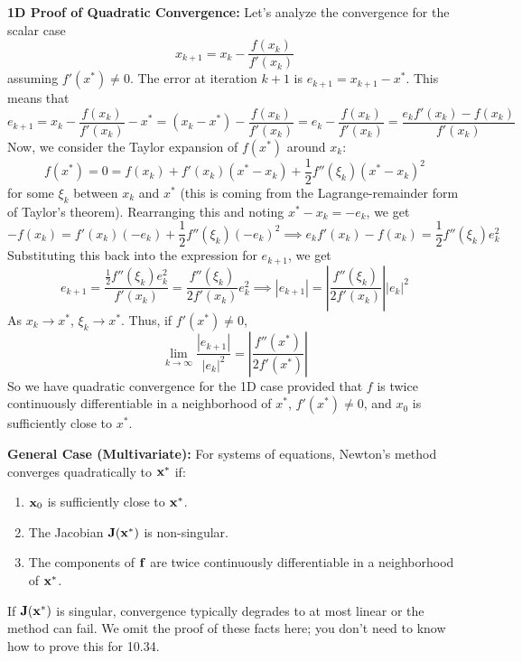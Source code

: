 \textbf{1D Proof of Quadratic Convergence:}
Let's analyze the convergence for the scalar case 
\begin{equation}
x_{k+1} = x_k - \frac{f(x_k)}{f'(x_k)}
\end{equation}
 assuming $f'(x^*) \neq 0$. The error at iteration $k+1$ is $e_{k+1} = x_{k+1} - x^*$. This means that
\begin{equation}
    e_{k+1} = x_k - \frac{f(x_k)}{f'(x_k)} - x^* = (x_k - x^*) - \frac{f(x_k)}{f'(x_k)} = e_k - \frac{f(x_k)}{f'(x_k)}
    = \frac{e_k f'(x_k) - f(x_k)}{f'(x_k)}
\end{equation}
Now, we consider the Taylor expansion of $f(x^*)$ around $x_k$:
\begin{equation}
    f(x^*) = 0 = f(x_k) + f'(x_k)(x^* - x_k) + \frac{1}{2}f''(\xi_k)(x^* - x_k)^2
\end{equation}
for some $\xi_k$ between $x_k$ and $x^*$ (this is coming from the Lagrange-remainder form of Taylor's theorem). Rearranging this and noting $x^* - x_k = -e_k$, we get
\begin{equation}
    -f(x_k) = f'(x_k)(-e_k) + \frac{1}{2}f''(\xi_k)(-e_k)^2
    \implies
    e_k f'(x_k) - f(x_k) = \frac{1}{2}f''(\xi_k)e_k^2
\end{equation}
Substituting this back into the expression for $e_{k+1}$, we get
\begin{equation}
    e_{k+1} = \frac{\frac{1}{2}f''(\xi_k)e_k^2}{f'(x_k)} = \frac{f''(\xi_k)}{2f'(x_k)} e_k^2
    \implies
    |e_{k+1}| = \left| \frac{f''(\xi_k)}{2f'(x_k)} \right| |e_k|^2
\end{equation}
As $x_k \to x^*$, $\xi_k \to x^*$. Thus, if $f'(x^*) \neq 0$,
\begin{equation}
    \lim_{k\to\infty} \frac{|e_{k+1}|}{|e_k|^2} = \left| \frac{f''(x^*)}{2f'(x^*)} \right|
\end{equation}
So we have quadratic convergence for the 1D case provided that $f$ is twice continuously differentiable in a neighborhood of $x^*$, $f'(x^*) \neq 0$, and $x_0$ is sufficiently close to $x^*$.

\textbf{General Case (Multivariate):}
For systems of equations, Newton's method converges quadratically to $\mathbf{x}^*$ if:
\begin{enumerate}
    \item $\mathbf{x}_0$ is sufficiently close to $\mathbf{x}^*$.
    \item The Jacobian $\mathbf{J}(\mathbf{x}^*)$ is non-singular.
    \item The components of $\mathbf{f}$ are twice continuously differentiable in a neighborhood of $\mathbf{x}^*$.
\end{enumerate}
If $\mathbf{J}(\mathbf{x}^*)$ is singular, convergence typically degrades to at most linear or the method can fail. We omit the proof of these facts here; you don't need to know how to prove this for 10.34.

